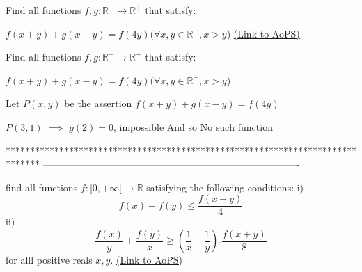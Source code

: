 \begin{problem}
	Find all functions $f,g:\mathbb{R}^{+} \to \mathbb{R}^{+}$ that satisfy:

$f(x+y)+g(x-y)=f(4y) (\forall x,y \in \mathbb{R}^{+},x>y$)
	\flushright \href{https://artofproblemsolving.com/community/c6h1618792}{(Link to AoPS)}
\end{problem}



\begin{solution}
	\begin{tcolorbox}Find all functions $f,g:\mathbb{R}^{+} \to \mathbb{R}^{+}$ that satisfy:

$f(x+y)+g(x-y)=f(4y) (\forall x,y \in \mathbb{R}^{+},x>y$)\end{tcolorbox}
Let $P(x,y)$ be the assertion $f(x+y)+g(x-y)=f(4y)$

$P(3,1)$ $\implies$ $g(2)=0$, impossible
And so $\boxed{\text{No such function}}$



\end{solution}
*******************************************************************************
-------------------------------------------------------------------------------

\begin{problem}
	find all functions $f:]0,+\infty[ \rightarrow \mathbb{R}$ satisfying the following conditions:
 i)$$f(x)+f(y) \leq \frac{f(x+y)}{4}$$
 ii)$$ \frac{f(x)}{y}+\frac{f(y)}{x} \geq (\frac{1}{x}+\frac{1}{y}) .\frac{f(x+y)}{8}$$
for alll positive reals $x,y$.
	\flushright \href{https://artofproblemsolving.com/community/c6h1619414}{(Link to AoPS)}
\end{problem}



